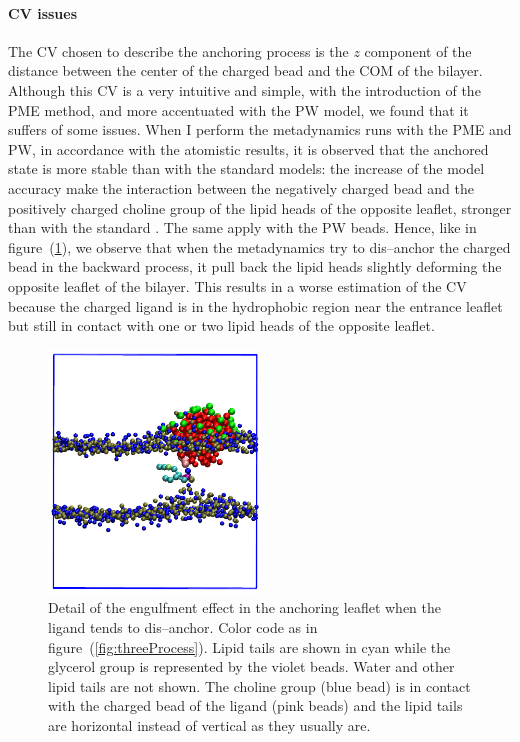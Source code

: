 \paragraph{\textbf{CV issues}} The \ac{CV} chosen to describe the anchoring process is the $z$ component of the distance between the center of the charged bead and the \ac{COM} of the bilayer. Although this \ac{CV} is a very intuitive and simple, with the introduction of the \ac{PME} method, and more accentuated with the \ac{PW} model, we found that it suffers of some issues. When I perform the metadynamics runs with the \ac{PME} and \ac{PW}, in accordance with the atomistic results, it is observed that the anchored state is more stable than with the standard \martini models: the increase of the model accuracy make the interaction between the negatively charged bead and the positively charged choline group of the lipid heads of the opposite leaflet, stronger than with the standard \martini. The same apply with the \ac{PW} beads. Hence, like in figure~(\ref{fig:engulfment}), we observe that when the metadynamics try to dis--anchor the charged bead in the backward process, it pull back the lipid heads slightly deforming the opposite leaflet of the bilayer. This results in a worse estimation of the \ac{CV} because the charged ligand is in the hydrophobic region near the entrance leaflet but still in contact with one or two lipid heads of the opposite leaflet.
\begin{figure}
	\centering
	\includegraphics[width=0.5\textwidth]{./img/patchedEngulfment}
	\caption{Detail of the engulfment effect in the anchoring leaflet when the ligand tends to dis--anchor. Color code as in figure~(\ref{fig:threeProcess}). Lipid tails are shown in cyan while the glycerol group is represented by the violet beads. Water and other lipid tails are not shown. The choline group (blue bead) is in contact with the charged bead of the ligand (pink beads) and the lipid tails are horizontal instead of vertical as they usually are.}
	\label{fig:engulfment}
\end{figure}
